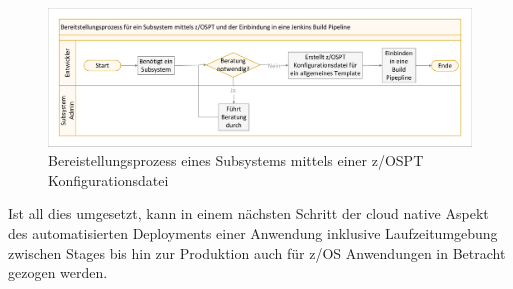 \begin{figure}[ht!]
\centering
\includegraphics[width=\paperwidth,angle=90]{figures/swimlaneNeuerProzess.pdf}
\caption{Bereistellungsprozess eines Subsystems mittels einer z/OSPT Konfigurationsdatei}
\label{fig:proneu}
\end{figure}

Ist all dies umgesetzt, kann in einem nächsten Schritt der cloud native Aspekt des automatisierten Deployments einer Anwendung inklusive Laufzeitumgebung zwischen Stages bis hin zur Produktion auch für z/OS Anwendungen in Betracht gezogen werden.
